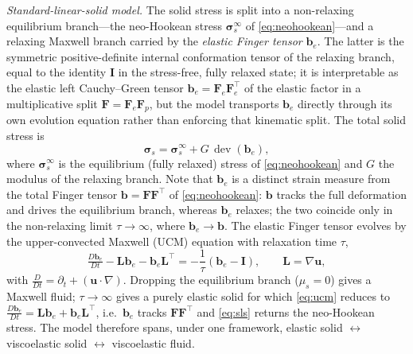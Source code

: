 \documentclass[final,3p,times]{elsarticle}
\theoremstyle{remark}
\newcommand{\uv}{\bm{u}}                 %
\newcommand{\Ften}{\bm{F}}              %
\newcommand{\bt}{\bm{b}}                 %
\newcommand{\be}{\bm{b}_e}              %
\newcommand{\Lt}{\bm{L}}                %
\newcommand{\It}{\bm{I}}                %
\newcommand{\sig}{\bm{\sigma}}          %
\newcommand{\grad}{\nabla}
\newcommand{\Dt}[1]{\tfrac{D #1}{D t}}
\newcommand{\dev}{\operatorname{dev}}
\begin{document}
\emph{Standard-linear-solid model.}
The solid stress is split into a non-relaxing equilibrium branch---the neo-Hookean stress
$\sig_{\!s}^{\infty}$ of \cref{eq:neohookean}---and a relaxing Maxwell branch carried by the
\emph{elastic Finger tensor} $\be$. The latter is the symmetric positive-definite internal
conformation tensor of the relaxing branch, equal to the identity $\It$ in the stress-free, fully
relaxed state; it is interpretable as the elastic left Cauchy--Green tensor
$\be=\Ften_e\Ften_e^{\!\top}$ of the elastic factor in a multiplicative split
$\Ften=\Ften_e\Ften_p$, but the model transports $\be$ directly through its own evolution equation
rather than enforcing that kinematic split. The total solid stress is
\begin{equation}
\sig_{\!s} = \sig_{\!s}^{\infty} + G\,\dev(\be),
\label{eq:sls}
\end{equation}
where $\sig_{\!s}^{\infty}$ is the equilibrium (fully relaxed) stress of \cref{eq:neohookean} and
$G$ the modulus of the relaxing branch. Note that $\be$ is a distinct strain measure from the
total Finger tensor $\bt=\Ften\Ften^{\!\top}$ of \cref{eq:neohookean}: $\bt$ tracks the full
deformation and drives the equilibrium branch, whereas $\be$ relaxes; the two coincide only in the
non-relaxing limit $\tau\to\infty$, where $\be\to\bt$. The elastic Finger tensor evolves by the
upper-convected Maxwell (UCM) equation with relaxation time $\tau$,
\begin{equation}
\Dt{\be} - \Lt\be - \be\Lt^{\!\top} = -\frac1\tau\left(\be-\It\right),
\qquad \Lt=\grad\uv,
\label{eq:ucm}
\end{equation}
with $\tfrac{D}{Dt}=\partial_t+(\uv\!\cdot\!\grad)$. Dropping the equilibrium branch
($\mu_s=0$) gives a Maxwell fluid; $\tau\to\infty$ gives a purely elastic solid for
which \cref{eq:ucm} reduces to $\Dt{\be}=\Lt\be+\be\Lt^{\!\top}$, i.e.\ $\be$ tracks
$\Ften\Ften^{\!\top}$ and \cref{eq:sls} returns the neo-Hookean stress. The model
therefore spans, under one framework, elastic solid $\leftrightarrow$ viscoelastic
solid $\leftrightarrow$ viscoelastic fluid.
\end{document}
